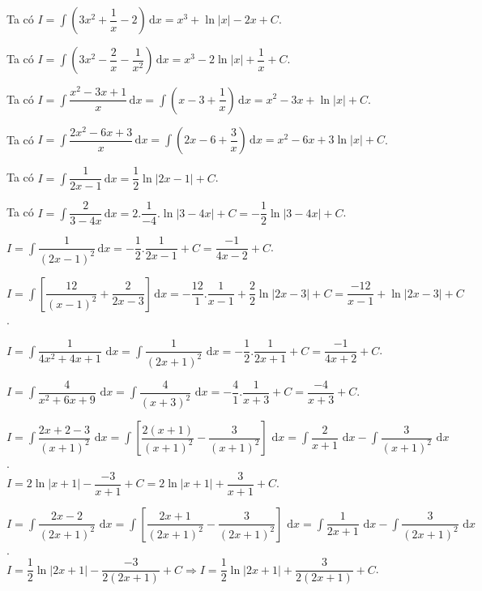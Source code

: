 \begin{vd}
{\begin{listEX}[1]
            \item Ta có $I=\displaystyle\int{\left( 3x^2+\dfrac{1}{x}-2 \right)\mathrm{\,d}x}=x^3+\ln \left| x \right|-2x+C$.
            \item Ta có $I=\displaystyle\int{\left( 3x^2-\dfrac{2}{x}-\dfrac{1}{x^2} \right)\mathrm{\,d}x}=x^3-2\ln \left| x \right|+\dfrac{1}{x}+C$.
            \item Ta có $I=\displaystyle\int{\dfrac{x^2-3x+1}{x}\mathrm{\,d}x}=\displaystyle\int{\left( x-3+\dfrac{1}{x} \right)\mathrm{\,d}x}=x^2-3x+\ln \left| x \right|+C$.
            \item Ta có $I=\displaystyle\int{\dfrac{2x^2-6x+3}{x}\mathrm{\,d}x}=\displaystyle\int{\left( 2x-6+\dfrac{3}{x} \right)\mathrm{\,d}x}=x^2-6x+3\ln \left| x \right|+C$.
            \item Ta có $I=\displaystyle\int{\dfrac{1}{2x-1}\mathrm{\,d}x}=\dfrac{1}{2}\ln \left| 2x-1 \right|+C$.
            \item Ta có $I=\displaystyle\int{\dfrac{2}{3-4x}\mathrm{\,d}x}=2.\dfrac{1}{-4}.\ln \left| 3-4x \right|+C=-\dfrac{1}{2}\ln \left| 3-4x \right|+C$.
            \item $I=\displaystyle\int{\dfrac{1}{{{\left( 2x-1 \right)}^2}}\mathrm{\,d}x=-\dfrac{1}{2}}.\dfrac{1}{2x-1}+C=\dfrac{-1}{4x-2}+C$.
            \item $I=\displaystyle\int{\left[ \dfrac{12}{{{\left( x-1 \right)}^2}}+\dfrac{2}{2x-3} \right]\mathrm{\,d}x=-\dfrac{12}{1}}.\dfrac{1}{x-1}+\dfrac{2}{2}\ln \left| 2x-3 \right|+C=\dfrac{-12}{x-1}+\ln \left| 2x-3 \right|+C$.
            \item $I=\displaystyle\int{\dfrac{1}{4x^2+4x+1}\textrm{ d}x=}\displaystyle\int{\dfrac{1}{{{\left( 2x+1 \right)}^2}}\textrm{ d}x=-\dfrac{1}{2}}.\dfrac{1}{2x+1}+C=\dfrac{-1}{4x+2}+C$.
            \item $I=\displaystyle\int{\dfrac{4}{x^2+6x+9}\textrm{ d}x=}\displaystyle\int{\dfrac{4}{{{\left( x+3 \right)}^2}}\textrm{ d}x=-\dfrac{4}{1}}.\dfrac{1}{x+3}+C=\dfrac{-4}{x+3}+C$.
            \item $I=\displaystyle\int{\dfrac{2x+2-3}{{{\left( x+1 \right)}^2}}\textrm{ d}x=\displaystyle\int{\left[ \dfrac{2(x+1)}{{{\left( x+1 \right)}^2}}-\dfrac{3}{{{\left( x+1 \right)}^2}} \right]}}\textrm{ d}x=\displaystyle\int{\dfrac{2}{x+1}\textrm{ d}x-\displaystyle\int{\dfrac{3}{{{\left( x+1 \right)}^2}}\textrm{ d}x}}$.\\
            $I=2\ln \left| x+1 \right|-\dfrac{-3}{x+1}+C=2\ln \left| x+1 \right|+\dfrac{3}{x+1}+C$.
            \item $I=\displaystyle\int{\dfrac{2x-2}{{{\left( 2x+1 \right)}^2}}\textrm{ d}x=\displaystyle\int{\left[ \dfrac{2x+1}{{{\left( 2x+1 \right)}^2}}-\dfrac{3}{{{\left( 2x+1 \right)}^2}} \right]}}\textrm{ d}x = \displaystyle\int{\dfrac{1}{2x+1}\textrm{ d}x-\displaystyle\int{\dfrac{3}{{{\left( 2x+1 \right)}^2}}\textrm{ d}x}}$.\\
            $I=\dfrac{1}{2}\ln \left| 2x+1 \right|-\dfrac{-3}{2\left( 2x+1 \right)}+C \Rightarrow I=\dfrac{1}{2}\ln \left| 2x+1 \right|+\dfrac{3}{2\left( 2x+1 \right)}+C$.
        \end{listEX}
		}
\end{vd}
